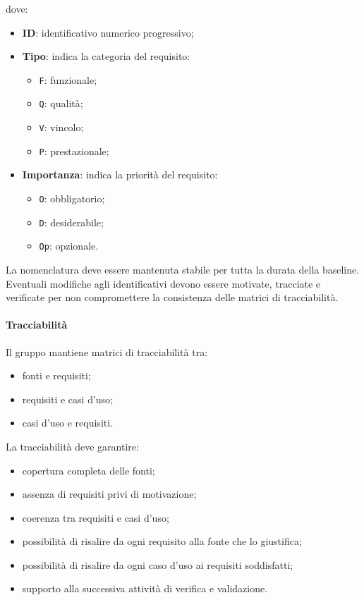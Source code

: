 dove:
\begin{itemize}
    \item \textbf{ID}: identificativo numerico progressivo;
    \item \textbf{Tipo}: indica la categoria del requisito:
    \begin{itemize}
        \item \texttt{F}: funzionale;
        \item \texttt{Q}: qualità;
        \item \texttt{V}: vincolo;
        \item \texttt{P}: prestazionale;
    \end{itemize}
    \item \textbf{Importanza}: indica la priorità del requisito:
    \begin{itemize}
        \item \texttt{O}: obbligatorio;
        \item \texttt{D}: desiderabile;
        \item \texttt{Op}: opzionale.
    \end{itemize}
\end{itemize}

La nomenclatura deve essere mantenuta stabile per tutta la durata della baseline.
Eventuali modifiche agli identificativi devono essere motivate, tracciate e
verificate per non compromettere la consistenza delle matrici di tracciabilità.

\paragraph{Tracciabilità}

Il gruppo mantiene matrici di tracciabilità tra:

\begin{itemize}
    \item fonti e requisiti;
    \item requisiti e casi d'uso;
    \item casi d'uso e requisiti.
\end{itemize}

La tracciabilità deve garantire:

\begin{itemize}
    \item copertura completa delle fonti;
    \item assenza di requisiti privi di motivazione;
    \item coerenza tra requisiti e casi d'uso;
    \item possibilità di risalire da ogni requisito alla fonte che lo giustifica;
    \item possibilità di risalire da ogni caso d'uso ai requisiti soddisfatti;
    \item supporto alla successiva attività di verifica e validazione.
\end{itemize}

